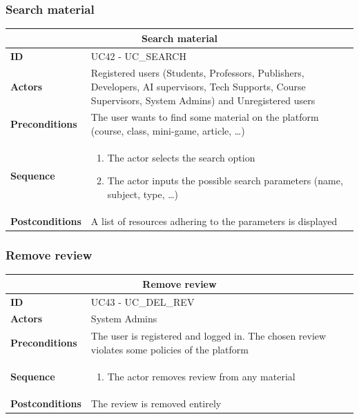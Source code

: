 \subsubsection{Search material}
\begin{tabular}{|m{2.5cm}|m{8cm}|}
	\hline
	\multicolumn{2}{|c|}{Search material} \\
	\hline
	\textbf{ID} & UC42 - UC\_SEARCH \\
	\hline
	\textbf{Actors} & Registered users (Students, Professors, Publishers, Developers, AI supervisors, Tech Supports, Course Supervisors, System Admins) and Unregistered users \\
	\hline
	\textbf{Preconditions} & The user wants to find some material on the platform (course, class, mini-game, article, …) \\
	\hline
	\textbf{Sequence} & 
	\begin{enumerate}
		\item The actor selects the search option
		\item The actor inputs the possible search parameters (name, subject, type, …)
	\end{enumerate} \\
	\hline
	\textbf{Postconditions} & A list of resources adhering to the parameters is displayed \\
	\hline
\end{tabular}

\subsubsection{Remove review}
\begin{tabular}{|m{2.5cm}|m{8cm}|}
	\hline
	\multicolumn{2}{|c|}{Remove review} \\
	\hline
	\textbf{ID} & UC43 - UC\_DEL\_REV \\
	\hline
	\textbf{Actors} & System Admins \\
	\hline
	\textbf{Preconditions} & The user is registered and logged in. The chosen review violates some policies of the platform \\
	\hline
	\textbf{Sequence} & 
	\begin{enumerate}
		\item The actor removes review from any material
	\end{enumerate} \\
	\hline
	\textbf{Postconditions} & The review is removed entirely \\
	\hline
\end{tabular}

